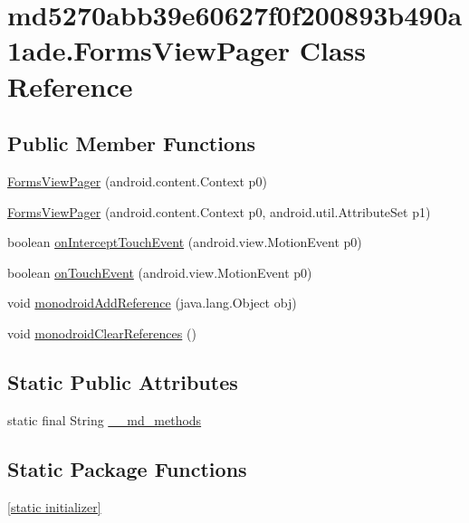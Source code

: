 \hypertarget{classmd5270abb39e60627f0f200893b490a1ade_1_1_forms_view_pager}{
\section{md5270abb39e60627f0f200893b490a1ade.FormsViewPager Class Reference}
\label{classmd5270abb39e60627f0f200893b490a1ade_1_1_forms_view_pager}
}
\subsection*{Public Member Functions}
\begin{CompactItemize}
\item 
\hyperlink{classmd5270abb39e60627f0f200893b490a1ade_1_1_forms_view_pager_1e733ee4a3786f4f7bd543951206fb73}{FormsViewPager} (android.content.Context p0)
\item 
\hyperlink{classmd5270abb39e60627f0f200893b490a1ade_1_1_forms_view_pager_b7dadec2523ca0ad6456f61a31fbe5c9}{FormsViewPager} (android.content.Context p0, android.util.AttributeSet p1)
\item 
boolean \hyperlink{classmd5270abb39e60627f0f200893b490a1ade_1_1_forms_view_pager_1ad288fa95e598ccb5cf989878fa5bbf}{onInterceptTouchEvent} (android.view.MotionEvent p0)
\item 
boolean \hyperlink{classmd5270abb39e60627f0f200893b490a1ade_1_1_forms_view_pager_48682b3406ea863f47698921ff4bb49e}{onTouchEvent} (android.view.MotionEvent p0)
\item 
void \hyperlink{classmd5270abb39e60627f0f200893b490a1ade_1_1_forms_view_pager_fd06d43e627d980375c67e56e0606283}{monodroidAddReference} (java.lang.Object obj)
\item 
void \hyperlink{classmd5270abb39e60627f0f200893b490a1ade_1_1_forms_view_pager_53b751fba028a911988261b0a536d2ab}{monodroidClearReferences} ()
\end{CompactItemize}
\subsection*{Static Public Attributes}
\begin{CompactItemize}
\item 
static final String \hyperlink{classmd5270abb39e60627f0f200893b490a1ade_1_1_forms_view_pager_0afe4852089db54f50fdcd4673a3538f}{\_\-\_\-md\_\-methods}
\end{CompactItemize}
\subsection*{Static Package Functions}
\begin{CompactItemize}
\item 
\hyperlink{classmd5270abb39e60627f0f200893b490a1ade_1_1_forms_view_pager_7a15304e5a23115e6a688a5d5e18761c}{\mbox{[}static initializer\mbox{]}}
\end{CompactItemize}
